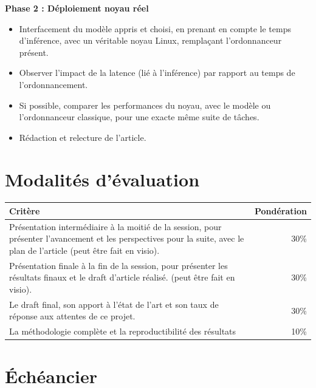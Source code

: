 \documentclass[11pt,a4paper]{article}
\begin{document}
\noindent\textbf{Phase 2 : Déploiement noyau réel}
\begin{itemize}[leftmargin=1.5em,itemsep=2pt]

    \item Interfacement du modèle appris et choisi, en prenant en compte le temps d'inférence, avec un véritable noyau Linux, remplaçant l'ordonnanceur présent.
    \item Observer l'impact de la latence (lié à l'inférence) par rapport au temps de l'ordonnancement.
    \item Si possible, comparer les performances du noyau, avec le modèle ou l'ordonnanceur classique, pour une exacte même suite de tâches.
    \item Rédaction et relecture de l'article.
\end{itemize}


\section{Modalités d'évaluation}
\begin{tabularx}{\linewidth}{@{}Xr@{}}
    \toprule
    \textbf{Critère} & \textbf{Pondération} \\
    \midrule
    Présentation intermédiaire à la moitié de la session, pour présenter l'avancement et les perspectives pour la suite, avec le plan de l'article (peut être fait en visio). & 30\% \\
    \addlinespace
    Présentation finale à la fin de la session, pour présenter les résultats finaux et le draft d'article réalisé. (peut être fait en visio). & 30\% \\
    \addlinespace
    Le draft final, son apport à l'état de l'art et son taux de réponse aux attentes de ce projet. & 30\% \\
    \addlinespace
    La méthodologie complète et la reproductibilité des résultats & 10\% \\
    \bottomrule
\end{tabularx}

\section{Échéancier}
\end{document}
